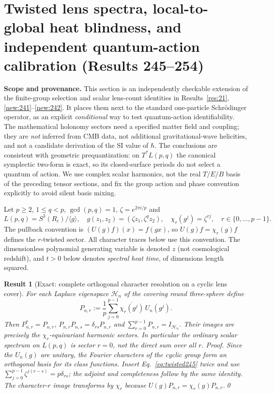 \documentclass[aps,prd,onecolumn,notitlepage,groupedaddress,11pt]{revtex4-2}
\newtheorem{result}{Result}
\begin{document}
\section{Twisted lens spectra, local-to-global heat blindness, and independent quantum-action calibration (Results 245--254)}\label{sec:twisted-action-calibration}
\noindent\textbf{Scope and provenance.} This section is an independently checkable extension of the finite-group selection and scalar lens-count identities in Results~\ref{res:21}, \ref{new:241}--\ref{new:242}. It places them next to the standard one-particle Schr\"odinger operator, as an explicit \emph{conditional} way to test quantum-action identifiability. The mathematical holonomy sectors need a specified matter field and coupling; they are \emph{not} inferred from CMB data, not additional gravitational-wave helicities, and not a candidate derivation of the SI value of $\hbar$. The conclusions are consistent with geometric prequantization: on $T^*L(p,q)$ the canonical symplectic two-form is exact, so its closed-surface periods do not select a quantum of action. We use complex scalar harmonics, not the real $T/E/B$ basis of the preceding tensor sections, and fix the group action and phase convention explicitly to avoid silent basis mixing.

Let $p\ge2$, $1\le q<p$, $\gcd(p,q)=1$, $\zeta=e^{2\pi i/p}$ and
\begin{equation}\label{eq:twisted-lens-def}
 L(p,q)=S^3(R_c)/\langle g\rangle,\quad g(z_1,z_2)=(\zeta z_1,\zeta^qz_2),\quad \chi_r(g^j)=\zeta^{rj},\quad r\in\{0,\ldots,p-1\}.
\end{equation}
The pullback convention is $(U(g)f)(x)=f(gx)$, so $U(g)f=\chi_r(g)f$ defines the $r$-twisted sector. All character traces below use this convention. The dimensionless polynomial generating variable is denoted $z$ (not cosmological redshift), and $t>0$ below denotes \emph{spectral heat time}, of dimensions length squared.

\begin{result}[\textsf{Exact}: complete orthogonal character resolution on a cyclic lens cover]\label{new:245}
For each Laplace eigenspace $\mathcal H_n$ of the covering round three-sphere define
\begin{equation}\label{eq:twisted245}
 P_{n,r}:=\frac1p\sum_{j=0}^{p-1}\overline{\chi_r(g^j)}\,U_n(g^j).
\end{equation}
Then $P_{n,r}^*=P_{n,r}$, $P_{n,r}P_{n,s}=\delta_{rs}P_{n,r}$ and $\sum_{r=0}^{p-1}P_{n,r}=I_{\mathcal H_n}$. Their images are precisely the $\chi_r$-equivariant harmonic sectors. In particular the ordinary scalar spectrum on $L(p,q)$ is sector $r=0$, not the direct sum over all $r$.
\textit{Proof.} Since the $U_n(g)$ are unitary, the Fourier characters of the cyclic group form an orthogonal basis for its class functions. Insert Eq.~\eqref{eq:twisted245} twice and use $\sum_{j=0}^{p-1}\zeta^{j(r-s)}=p\delta_{rs}$; the adjoint and completeness follow by the same identity. The character-$r$ image transforms by $\chi_r$ because $U(g)P_{n,r}=\chi_r(g)P_{n,r}$.\qed
\end{result}
\end{document}
